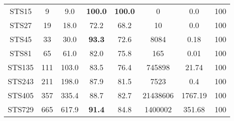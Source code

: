 \begin{longtable}{@{\extracolsep{5pt}}cccccccc}
	STS15 &
		9 & 9.0 &
			\textbf{100.0}
		&
			\textbf{100.0}
		& 0 & 0.0 & 100
	\\
	STS27 &
		19 & 18.0 &
			72.2
		&
			68.2
		& 10 & 0.0 & 100
	\\
	STS45 &
		33 & 30.0 &
			\textbf{93.3}
		&
			72.6
		& 8084 & 0.18 & 100
	\\
	STS81 &
		65 & 61.0 &
			82.0
		&
			75.8
		& 165 & 0.01 & 100
	\\
	STS135 &
		111 & 103.0 &
			83.5
		&
			76.4
		& 745898 & 21.74 & 100
	\\
	STS243 &
		211 & 198.0 &
			87.9
		&
			81.5
		& 7523 & 0.4 & 100
	\\
	STS405 &
		357 & 335.4 &
			88.7
		&
			82.7
		& 21438606 & 1767.19 & 100
	\\
	STS729 &
		665 & 617.9 &
			\textbf{91.4}
		&
			84.8
		& 1400002 & 351.68 & 100
	\\
\end{longtable}
